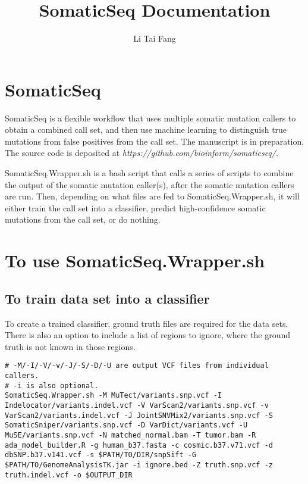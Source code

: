 \documentclass[10pt,letterpaper]{article}
\author{Li Tai Fang}
\title{SomaticSeq Documentation}
\begin{document}
\maketitle




\section{SomaticSeq}

SomaticSeq is a flexible workflow that uses multiple somatic mutation callers to obtain a combined call set, and then use machine learning to distinguish true mutations from false positives from the call set. The manuscript is in preparation. The source code is deposited at \textit{https://github.com/bioinform/somaticseq/}. 

SomaticSeq.Wrapper.sh is a bash script that calls a series of scripts to combine the output of the somatic mutation caller(s), after the somatic mutation callers are run. Then, depending on what files are fed to SomaticSeq.Wrapper.sh, it will either train the call set into a classifier, predict high-confidence somatic mutations from the call set, or do nothing. 



\section{To use SomaticSeq.Wrapper.sh}

\subsection{To train data set into a classifier}

To create a trained classifier, ground truth files are required for the data sets. There is also an option to include a list of regions to ignore, where the ground truth is not known in those regions. 

\begin{lstlisting}
# -M/-I/-V/-v/-J/-S/-D/-U are output VCF files from individual callers.
# -i is also optional.
SomaticSeq.Wrapper.sh -M MuTect/variants.snp.vcf -I Indelocator/variants.indel.vcf -V VarScan2/variants.snp.vcf -v VarScan2/variants.indel.vcf -J JointSNVMix2/variants.snp.vcf -S SomaticSniper/variants.snp.vcf -D VarDict/variants.vcf -U MuSE/variants.snp.vcf -N matched_normal.bam -T tumor.bam -R ada_model_builder.R -g human_b37.fasta -c cosmic.b37.v71.vcf -d dbSNP.b37.v141.vcf -s $PATH/TO/DIR/snpSift -G $PATH/TO/GenomeAnalysisTK.jar -i ignore.bed -Z truth.snp.vcf -z truth.indel.vcf -o $OUTPUT_DIR
\end{lstlisting}
\end{document}

